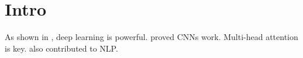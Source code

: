 \documentclass{article}
\begin{document}
\section{Intro}
As shown in \cite{he2016deep}, deep learning is powerful.
\citet{krizhevsky2012imagenet} proved CNNs work.
Multi-head attention \citep{vaswani2017attention} is key.
\citeauthor{vaswani2017attention} also contributed to NLP.


\end{document}
